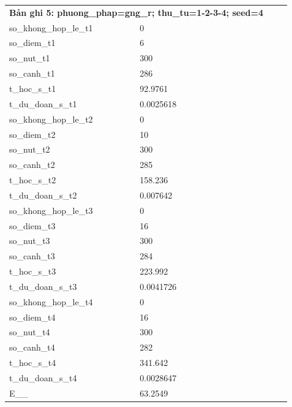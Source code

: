 \begin{longtable}{p{0.43\linewidth}p{0.50\linewidth}}
\midrule
\multicolumn{2}{p{0.95\linewidth}}{\textbf{Bản ghi 5: phuong\_phap=gng\_r; thu\_tu=1-2-3-4; seed=4}} \\
so\_\allowbreak khong\_\allowbreak hop\_\allowbreak le\_\allowbreak t1 & 0 \\
so\_\allowbreak diem\_\allowbreak t1 & 6 \\
so\_\allowbreak nut\_\allowbreak t1 & 300 \\
so\_\allowbreak canh\_\allowbreak t1 & 286 \\
t\_\allowbreak hoc\_\allowbreak s\_\allowbreak t1 & 92.9761 \\
t\_\allowbreak du\_\allowbreak doan\_\allowbreak s\_\allowbreak t1 & 0.0025618 \\
so\_\allowbreak khong\_\allowbreak hop\_\allowbreak le\_\allowbreak t2 & 0 \\
so\_\allowbreak diem\_\allowbreak t2 & 10 \\
so\_\allowbreak nut\_\allowbreak t2 & 300 \\
so\_\allowbreak canh\_\allowbreak t2 & 285 \\
t\_\allowbreak hoc\_\allowbreak s\_\allowbreak t2 & 158.236 \\
t\_\allowbreak du\_\allowbreak doan\_\allowbreak s\_\allowbreak t2 & 0.007642 \\
so\_\allowbreak khong\_\allowbreak hop\_\allowbreak le\_\allowbreak t3 & 0 \\
so\_\allowbreak diem\_\allowbreak t3 & 16 \\
so\_\allowbreak nut\_\allowbreak t3 & 300 \\
so\_\allowbreak canh\_\allowbreak t3 & 284 \\
t\_\allowbreak hoc\_\allowbreak s\_\allowbreak t3 & 223.992 \\
t\_\allowbreak du\_\allowbreak doan\_\allowbreak s\_\allowbreak t3 & 0.0041726 \\
so\_\allowbreak khong\_\allowbreak hop\_\allowbreak le\_\allowbreak t4 & 0 \\
so\_\allowbreak diem\_\allowbreak t4 & 16 \\
so\_\allowbreak nut\_\allowbreak t4 & 300 \\
so\_\allowbreak canh\_\allowbreak t4 & 282 \\
t\_\allowbreak hoc\_\allowbreak s\_\allowbreak t4 & 341.642 \\
t\_\allowbreak du\_\allowbreak doan\_\allowbreak s\_\allowbreak t4 & 0.0028647 \\
E\_\allowbreak 1\_\allowbreak 1 & 63.2549 \\

\end{longtable}
